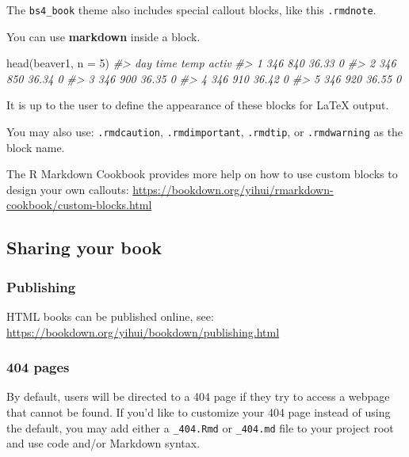 \documentclass[
]{bxjsbook}
\newenvironment{Shaded}{\begin{snugshade}}{\end{snugshade}}
\newcommand{\AttributeTok}[1]{\textcolor[rgb]{0.77,0.63,0.00}{#1}}
\newcommand{\CommentTok}[1]{\textcolor[rgb]{0.56,0.35,0.01}{\textit{#1}}}
\newcommand{\DecValTok}[1]{\textcolor[rgb]{0.00,0.00,0.81}{#1}}
\newcommand{\FunctionTok}[1]{\textcolor[rgb]{0.00,0.00,0.00}{#1}}
\newcommand{\NormalTok}[1]{#1}
\theoremstyle{definition}
\theoremstyle{definition}
\theoremstyle{definition}
\theoremstyle{definition}
\theoremstyle{remark}
\begin{document}
The \texttt{bs4\_book} theme also includes special callout blocks, like this \texttt{.rmdnote}.

You can use \textbf{markdown} inside a block.

\begin{Shaded}
\begin{Highlighting}[]
\FunctionTok{head}\NormalTok{(beaver1, }\AttributeTok{n =} \DecValTok{5}\NormalTok{)}
\CommentTok{\#\textgreater{}   day time  temp activ}
\CommentTok{\#\textgreater{} 1 346  840 36.33     0}
\CommentTok{\#\textgreater{} 2 346  850 36.34     0}
\CommentTok{\#\textgreater{} 3 346  900 36.35     0}
\CommentTok{\#\textgreater{} 4 346  910 36.42     0}
\CommentTok{\#\textgreater{} 5 346  920 36.55     0}
\end{Highlighting}
\end{Shaded}

It is up to the user to define the appearance of these blocks for LaTeX output.

You may also use: \texttt{.rmdcaution}, \texttt{.rmdimportant}, \texttt{.rmdtip}, or \texttt{.rmdwarning} as the block name.

The R Markdown Cookbook provides more help on how to use custom blocks to design your own callouts: \url{https://bookdown.org/yihui/rmarkdown-cookbook/custom-blocks.html}

\hypertarget{sharing-your-book}{%
\subsection{Sharing your book}\label{sharing-your-book}}

\hypertarget{publishing}{%
\subsubsection{Publishing}\label{publishing}}

HTML books can be published online, see: \url{https://bookdown.org/yihui/bookdown/publishing.html}

\hypertarget{pages}{%
\subsubsection{404 pages}\label{pages}}

By default, users will be directed to a 404 page if they try to access a webpage that cannot be found. If you'd like to customize your 404 page instead of using the default, you may add either a \texttt{\_404.Rmd} or \texttt{\_404.md} file to your project root and use code and/or Markdown syntax.
\end{document}
